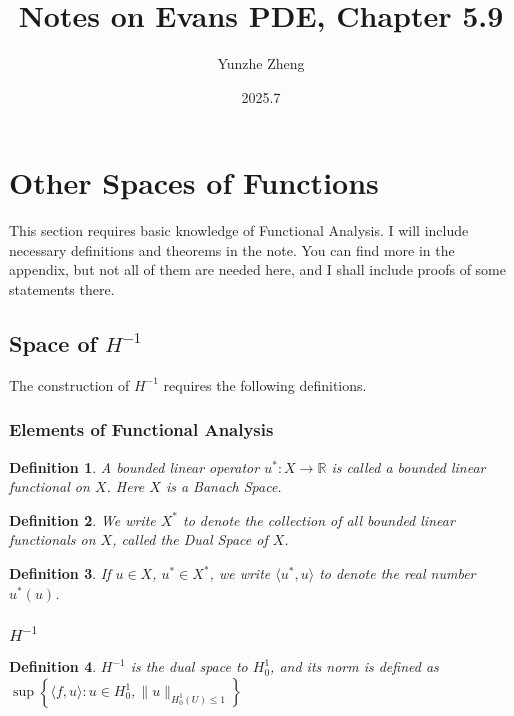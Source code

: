 \documentclass{article}
\title{Notes on Evans PDE, Chapter 5.9}
\author{Yunzhe Zheng}
\date{2025.7}
\begin{document}
\maketitle

\section{Other Spaces of Functions}

\indent\indent This section requires basic knowledge of Functional Analysis. I will include necessary definitions and theorems in the note. You can find more in the appendix, but not all of them are needed here, and I shall include proofs of some statements there.

\subsection{Space of $H^{-1}$}
\indent\indent The construction of $H^{-1}$ requires the following definitions.
\newtheorem{Def}{Definition}[section]

\subsubsection{Elements of Functional Analysis}
\begin{Def}
    A bounded linear operator $u^*: X\to\mathbb{R}$ is called a bounded linear functional on $X$. Here $X$ is a Banach Space.
\end{Def}

\begin{Def}
    We write $X^*$ to denote the collection of all bounded linear functionals on $X$, called the Dual Space of $X$.
\end{Def}

\begin{Def}
    If $u\in X$, $u^*\in X^*$, we write $\langle u^*, u\rangle$ to denote the real number $u^*(u)$.
\end{Def}

\subsubsection{$H^{-1}$}

\begin{Def}
    $H^{-1}$ is the dual space to $H_{0}^1$, and its norm is defined as $\sup\left\{\langle f,u\rangle: u\in H^{1}_{0}, \|u\|_{H_{0}^{1}(U)\leq 1}\right\}$
\end{Def}
\end{document}
